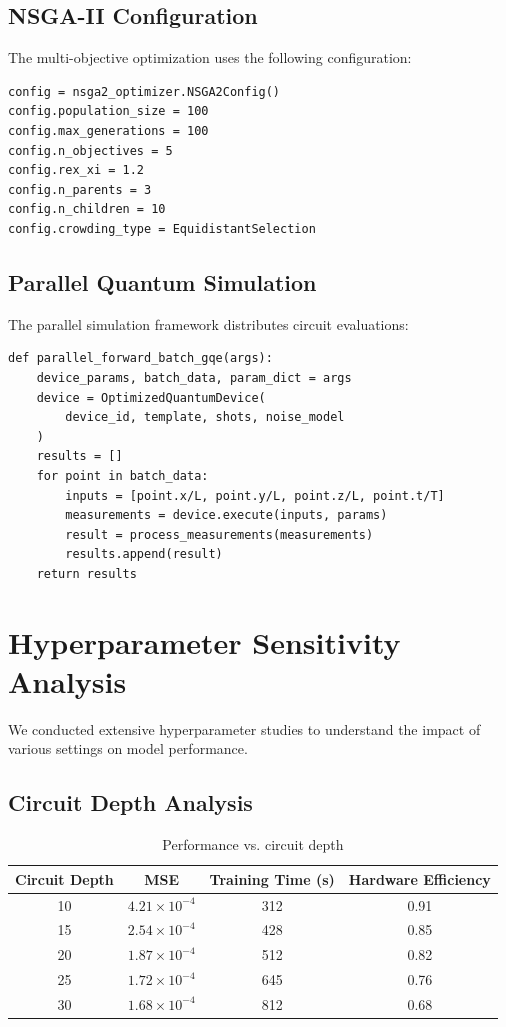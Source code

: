 \documentclass[11pt,a4paper,uplatex,dvipdfmx]{jsarticle}
\begin{document}
\subsection{NSGA-II Configuration}

The multi-objective optimization uses the following configuration:

\begin{lstlisting}[caption={NSGA-II configuration},label={lst:nsga2}]
config = nsga2_optimizer.NSGA2Config()
config.population_size = 100
config.max_generations = 100
config.n_objectives = 5
config.rex_xi = 1.2
config.n_parents = 3
config.n_children = 10
config.crowding_type = EquidistantSelection
\end{lstlisting}

\subsection{Parallel Quantum Simulation}

The parallel simulation framework distributes circuit evaluations:

\begin{lstlisting}[caption={Parallel circuit evaluation},label={lst:parallel}]
def parallel_forward_batch_gqe(args):
    device_params, batch_data, param_dict = args
    device = OptimizedQuantumDevice(
        device_id, template, shots, noise_model
    )
    results = []
    for point in batch_data:
        inputs = [point.x/L, point.y/L, point.z/L, point.t/T]
        measurements = device.execute(inputs, params)
        result = process_measurements(measurements)
        results.append(result)
    return results
\end{lstlisting}

\section{Hyperparameter Sensitivity Analysis}

We conducted extensive hyperparameter studies to understand the impact of various settings on model performance.

\subsection{Circuit Depth Analysis}

\begin{table}[h]
\centering
\caption{Performance vs. circuit depth}
\begin{tabular}{cccc}
\toprule
Circuit Depth & MSE & Training Time (s) & Hardware Efficiency \\
\midrule
10 & $4.21 \times 10^{-4}$ & 312 & 0.91 \\
15 & $2.54 \times 10^{-4}$ & 428 & 0.85 \\
20 & $1.87 \times 10^{-4}$ & 512 & 0.82 \\
25 & $1.72 \times 10^{-4}$ & 645 & 0.76 \\
30 & $1.68 \times 10^{-4}$ & 812 & 0.68 \\
\bottomrule
\end{tabular}
\end{table}
\end{document}
